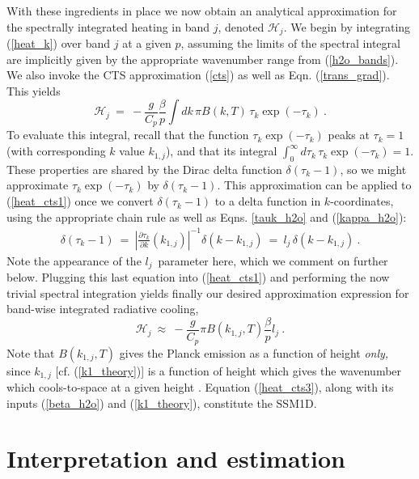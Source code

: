 \documentclass{ametsoc}
\newcommand{\beqn}{\begin{equation}}
\newcommand{\eeqn}{\end{equation}}
\newcommand{\eqnref}[1]{(\ref{#1})}
\newcommand{\inverse}{^{-1}}
\newcommand{\partialder}[2]{\ensuremath{\frac{\partial #1}{\partial #2}}}
\newcommand{\Cp}{\ensuremath{C_p}}
\newcommand{\ch}{\ensuremath{\mathcal{H}}}
\newcommand{\lj}{\ensuremath{l_j}}
\newcommand{\tauk}{\ensuremath{\tau_k}}
\newcommand{\konej}{\ensuremath{k_{1,j}}}
\begin{document}
With these ingredients in place  we now obtain an analytical approximation for the spectrally integrated heating in band $j$, denoted $\ch_j$. We begin by integrating \eqnref{heat_k}  over band $j$ at a given $p$, assuming the limits of the spectral integral are implicitly given by  the appropriate wavenumber range from \eqnref{h2o_bands}. We also  invoke the CTS approximation \eqnref{cts} as well as Eqn.  \eqnref{trans_grad}. This yields
 \beqn
\ch_j \ =   \ -  \frac{g}{\Cp}\frac{\beta}{p}\int dk\,  \pi B(k,T)\, \tauk \exp(-\tauk) \ .
	\label{heat_cts1}
\eeqn
 To evaluate this integral, recall that the function $\tauk\exp(-\tauk)$ peaks at $\tauk=1$ (with corresponding $k$ value $\konej$), and that its integral $\int_0^\infty d\tauk\,\tauk\exp(-\tauk)=1$.  These properties are shared by the Dirac delta function $\delta(\tauk -1)$, so we might approximate $\tauk\exp(-\tauk)$ by $\delta(\tauk -1)$. This approximation can be applied to \eqnref{heat_cts1} once we convert $\delta(\tauk -1)$ to a delta function in $k$-coordinates, using the appropriate chain rule \citep[e.g.][]{gasiorowicz2003} as well as Eqns. \eqref{tauk_h2o} and \eqnref{kappa_h2o}:
    \begin{align*}
               \delta(\tau_k- 1) \ = \ \left|\partialder{\tau_k}{k}(\konej)\right|\inverse\!\!\delta(k-\konej) \ = \ \lj\,  \delta(k-\konej)  \ .
      \end{align*}
Note the appearance of the \lj\ parameter here, which we comment on further below. Plugging this last equation into \eqnref{heat_cts1} and performing the now trivial spectral integration yields finally our desired approximation expression for band-wise integrated radiative cooling,
\beqn
		\ch_j  \ \approx \ - \frac{g}{\Cp}\pi B(\konej,T)\frac{\beta}{p} \lj \ .
	\label{heat_cts3}
\eeqn
Note that $B(\konej,T)$ gives the Planck emission as a function of height \emph{only,} since $\konej$ [cf. \eqnref{k1_theory}] is a function of height which gives the wavenumber which cools-to-space at a given height . Equation \eqnref{heat_cts3}, along with its inputs \eqnref{beta_h2o} and \eqnref{k1_theory}, constitute the SSM1D.  

 \section{Interpretation and estimation} \label{sec_interpretation}

\end{document}
